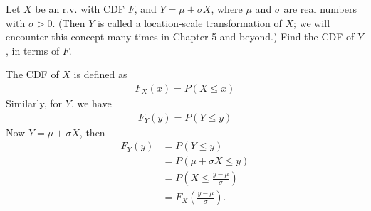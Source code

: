 
\setcounter{theorem}{2}
\begin{exercise} [BH.1.3]
  Let $X$ be an r.v. with CDF $F$, and $Y = \mu + \sigma X$, where $\mu$ and $\sigma$ are real numbers with $\sigma > 0$. (Then $Y$ is called a location-scale transformation of $X$; we will encounter this concept many times in Chapter 5 and beyond.) Find the CDF of $Y$, in terms of $F$.
\begin{solution}
	The CDF of $X$ is defined as
	\begin{align*}
		F_{X}(x) = P(X\leq x)
	\end{align*}
	Similarly, for $Y$, we have
	\begin{align*}
		F_{Y}(y) = P(Y\leq y)
	\end{align*}
	Now $Y=\mu + \sigma X$, then 
	\begin{align*}
		F_{Y}(y)&=P(Y\leq y)\\
		&=  P(\mu + \sigma X\leq y) \\
		&= P\left(X\leq \frac{y-\mu}{\sigma}\right)\\
		&= F_{X}\left(\frac{y-\mu}{\sigma}\right).
	\end{align*}
\end{solution}
\end{exercise}


